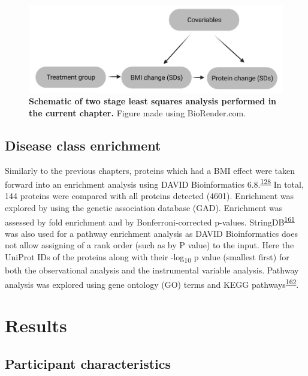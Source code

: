 \documentclass[11pt,twoside]{bristolthesis}
\begin{document}
\begin{figure}
\includegraphics{figure/DiRECT/DiRECT_analysis} \caption[Schematic of two stage least squares analysis performed using DiRECT data]{\textbf{Schematic of two stage least squares analysis performed in the current chapter.} Figure made using BioRender.com.}\label{fig:direct-tsls}
\end{figure}
\hypertarget{disease-class-enrichment}{%
\subsection{Disease class enrichment}\label{disease-class-enrichment}}

Similarly to the previous chapters, proteins which had a BMI effect were taken forward into an enrichment analysis using DAVID Bioinformatics 6.8.\textsuperscript{\protect\hyperlink{ref-Huang2009}{128}} In total, 144 proteins were compared with all proteins detected (4601). Enrichment was explored by using the genetic association database (GAD). Enrichment was assessed by fold enrichment and by Bonferroni-corrected p-values. StringDB\textsuperscript{\protect\hyperlink{ref-Szklarczyk2021}{161}} was also used for a pathway enrichment analysis as DAVID Bioinformatics does not allow assigning of a rank order (such as by P value) to the input. Here the UniProt IDs of the proteins along with their -log\textsubscript{10} p value (smallest first) for both the observational analysis and the instrumental variable analysis. Pathway analysis was explored using gene ontology (GO) terms and KEGG pathways\textsuperscript{\protect\hyperlink{ref-Kanehisa2016}{162}}.

\hypertarget{results-4}{%
\section{Results}\label{results-4}}

\hypertarget{participant-characteristics-2}{%
\subsection{Participant characteristics}\label{participant-characteristics-2}}
\end{document}
